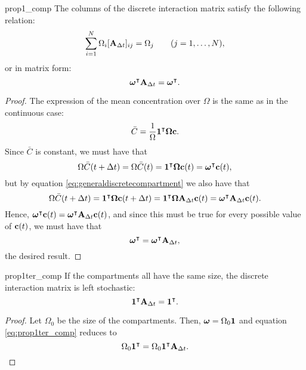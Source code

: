 \begin{propertyter}{prop1_comp} \label{prop1ter_comp} \label{prop2_discr_comp}
	The columns of the discrete interaction matrix satisfy the following relation:
	\begin{equation}
		\sum_{i=1}^N \Omega_i  [\mathbf A_{\Delta t}]_{ij} = \Omega_j \qquad (j=1,\dots,N),
	\end{equation}
	or in matrix form:
	\begin{equation}
		\boldsymbol \omega^\intercal \mathbf A_{\Delta t} = \boldsymbol \omega^\intercal .
	\end{equation}
\end{propertyter}
\begin{proof}
	The expression of the mean concentration over $\Omega$ is the same as in the continuous case:
	\begin{equation}
		\bar C = \frac{1}{\Omega} \mathbf 1^\intercal \boldsymbol \Omega \mathbf c.
	\end{equation}
	Since $\bar C$ is constant, we must have that
	\begin{equation}
		\Omega \bar C(t+\Delta t) = \Omega \bar C(t) = \mathbf1^\intercal \boldsymbol \Omega \mathbf c(t) = \boldsymbol \omega^\intercal \mathbf c(t),
	\end{equation}
	but by equation \eqref{eq:generaldiscretecompartment} we also have that
	\begin{equation}
		\Omega \bar C(t+\Delta t) = \mathbf1^\intercal \boldsymbol \Omega \mathbf c(t+\Delta t) = \mathbf1^\intercal \boldsymbol \Omega \mathbf A_{\Delta t} \mathbf c(t) = \boldsymbol \omega^\intercal \mathbf A_{\Delta t} \mathbf c(t).
	\end{equation}
	Hence, $\boldsymbol \omega^\intercal \mathbf c(t) = \boldsymbol \omega^\intercal \mathbf A_{\Delta t} \mathbf c(t)$, and since this must be true for every possible value of $\mathbf c(t)$, we must have that
	\begin{equation} \label{eq:prop1ter_comp}
		\boldsymbol \omega^\intercal = \boldsymbol \omega^\intercal \mathbf A_{\Delta t},
	\end{equation}
	the desired result.
\end{proof}
\begin{corollary}{prop1ter_comp} \label{corollary2}
	If the compartments all have the same size, the discrete interaction matrix is  left stochastic:
	\begin{equation}
		\mathbf 1^\intercal \mathbf A_{\Delta t} = \mathbf 1^\intercal.
	\end{equation}
\end{corollary}
\begin{proof}
	Let $\Omega_0$ be the size of the compartments. Then, $\boldsymbol \omega = \Omega_0 \mathbf 1$ and equation \eqref{eq:prop1ter_comp} reduces to
	\begin{equation}
		\Omega_0 \mathbf 1^\intercal = \Omega_0 \mathbf 1^\intercal \mathbf A_{\Delta t}.
	\end{equation}
\end{proof}
